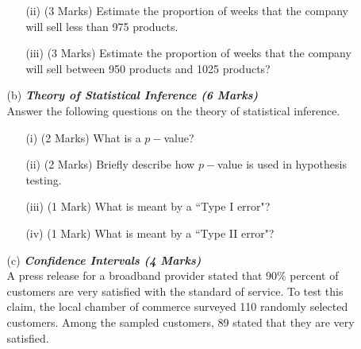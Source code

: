 \documentclass[a4paper,12pt]{article}
\begin{document}
\begin{itemize}
\begin{itemize}
\begin{itemize}
\item[(ii)] (3 Marks) Estimate the proportion of weeks that the company will sell less than 975 products.
\item[(iii)] (3 Marks) Estimate the proportion of weeks that the company will sell between 950
products and 1025 products?
\end{itemize}

\item[(b)] \textbf{\textit{Theory of Statistical Inference (6 Marks)}}\\Answer the following questions on the theory of statistical inference.
\begin{itemize}
\item[(i)] (2 Marks) What is a $p-$value?
\item[(ii)] (2 Marks) Briefly describe how $p-$value is used in hypothesis testing.
\item[(iii)] (1 Mark) What is meant by a ``Type I error"?
\item[(iv)] (1 Mark) What is meant by a ``Type II error"?
\end{itemize}
\bigskip

\item[(c)] \textbf{\textit{Confidence Intervals (4 Marks)}}\\
A press release for a broadband provider stated that $90\%$ percent of customers are very satisfied
with the standard of service. To test this claim, the local chamber of commerce surveyed 110 randomly selected customers. Among the sampled customers, 89 stated that they are very satisfied.






\end{itemize}
\end{itemize}
\end{document}
